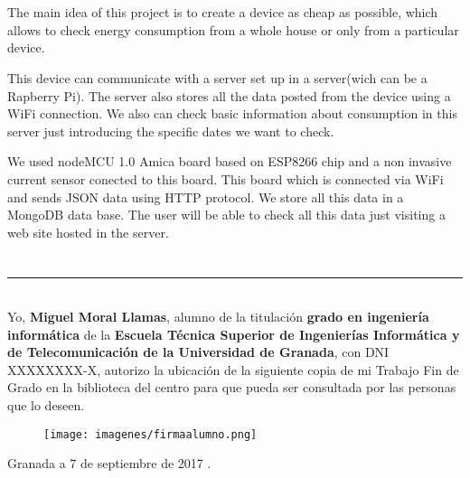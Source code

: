 \\

\vspace{0.7cm}
\\

The main idea of this project is to create a device as cheap as possible, which allows to check energy consumption from a whole house or only from a particular device.


This device can communicate with a server set up in a server(wich can be a Rapberry Pi). The server also stores all the data posted from the device using a WiFi connection. We also can check basic information about consumption in this server just introducing the specific dates we want to check. 


We used nodeMCU 1.0 Amica board based on ESP8266 chip and a non invasive current sensor conected to this board. This board which is connected via WiFi and sends JSON data using HTTP protocol. We store all this data in a MongoDB data base. The user will be able to check all this data just visiting a web site hosted in the server. 


\chapter*{}
\thispagestyle{empty}

\noindent\rule[-1ex]{\textwidth}{2pt}\\[4.5ex]

Yo, \textbf{Miguel Moral Llamas}, alumno de la titulación \textbf{grado en ingeniería informática} de la \textbf{Escuela Técnica Superior
de Ingenierías Informática y de Telecomunicación de la Universidad de Granada}, con DNI XXXXXXXX-X, autorizo la
ubicación de la siguiente copia de mi Trabajo Fin de Grado en la biblioteca del centro para que pueda ser
consultada por las personas que lo deseen.

\vspace{2cm}

\begin{figure}[H]
	\centering
	\texttt{[image: imagenes/firmaalumno.png]}
	\label{fig:firmaalumno}
\end{figure}



\vspace{2cm}

\begin{flushright}
Granada a 7 de septiembre de 2017 .
\end{flushright}


